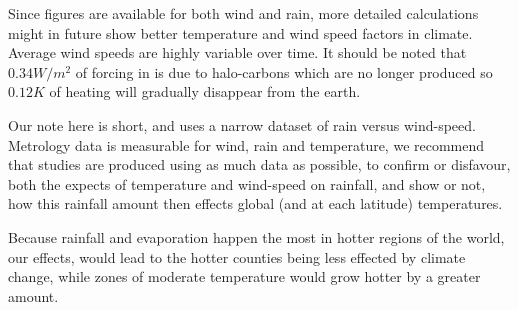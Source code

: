 \documentclass{book}
\begin{document}
     Since figures are available for both wind and rain, more detailed calculations might in future show better temperature and wind speed factors in climate. Average wind speeds are highly variable over time. It should be noted that $0.34 W/m^2$ of forcing in \cite{Radiative} is due to halo-carbons which are no longer produced so $0.12K$ of heating will gradually disappear from the earth.
     
           		
   Our note here is short, and uses a narrow dataset of rain versus wind-speed. Metrology data is measurable for wind, rain and temperature, we recommend that studies are produced using as much data as possible, to
   confirm or disfavour, both the expects of temperature and wind-speed on rainfall, and show or not, how this rainfall amount then effects global (and at each latitude) temperatures.
   
   Because rainfall and evaporation happen the most in hotter regions of the world, our effects, would lead to the hotter counties being less effected by climate change, while zones of moderate temperature would grow hotter by a greater amount.
           		
\end{document}
